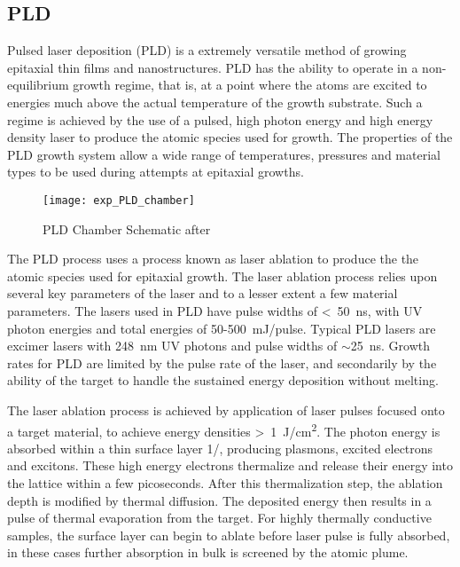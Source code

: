 \subsection{PLD}
Pulsed laser deposition (PLD) is a extremely versatile method of growing epitaxial thin films and nanostructures. PLD has the ability to operate in a non-equilibrium growth regime, that is, at a point where the atoms are excited to energies much above the actual temperature of the growth substrate.  Such a regime is achieved by the use of a pulsed, high photon energy and high energy density laser to produce the atomic species used for growth. The properties of the PLD growth system allow a wide range of temperatures, pressures and material types to be used during attempts at epitaxial growths.
\begin{figure}
    \centering
    \texttt{[image: exp\_PLD\_chamber]}
    \caption{\label{fig:exp_pld_chamber}PLD Chamber Schematic after \cite{stephen-thesis}}
\end{figure}

The PLD process uses a process known as laser ablation to produce the the atomic species used for epitaxial growth. The laser ablation process relies upon several key parameters of the laser and to a lesser extent a few material parameters. The lasers used in PLD have pulse widths of <~50~ns, with UV photon energies and total energies of 50-500~mJ/pulse. Typical PLD lasers are excimer lasers with 248~nm UV photons and pulse widths of $\sim$25~ns. Growth rates for PLD are limited by the pulse rate of the laser, and secondarily by the ability of the target to handle the sustained energy deposition without melting.

The laser ablation process is achieved by application of laser pulses focused onto a target material, to achieve energy densities >~1~J/cm\textsuperscript{2}. The photon energy is absorbed within a thin surface layer 1/\textalpha, producing plasmons, excited electrons and excitons\cite{Willmott2000}. These high energy electrons thermalize and release their energy into the lattice within a few picoseconds. After this thermalization step, the ablation depth is modified by thermal diffusion. The deposited energy then results in a pulse of thermal evaporation from the target. For highly thermally conductive samples, the surface layer can begin to ablate before laser pulse is fully absorbed, in these cases further absorption in bulk is screened by the atomic plume.

